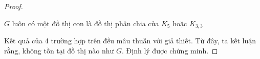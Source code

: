 \begin{proof}
\begin{figure}[H]
\begin{minipage}{0.4\textwidth}
\begin{tikzpicture}[scale = 0.8]
            \end{tikzpicture}
        \end{minipage}
    \end{figure}
    \begin{remark}
        $G$ luôn có một đồ thị con là  đồ thị phân chia của $K_5$ hoặc $K_{3,3}$
    \end{remark}
    Kết quả của 4 trường hợp trên đều mâu thuẫn với giả thiết. Từ đây, ta kết luận rằng, không tồn tại đồ thị nào như $G$. Định lý được chứng minh.
\end{proof}
